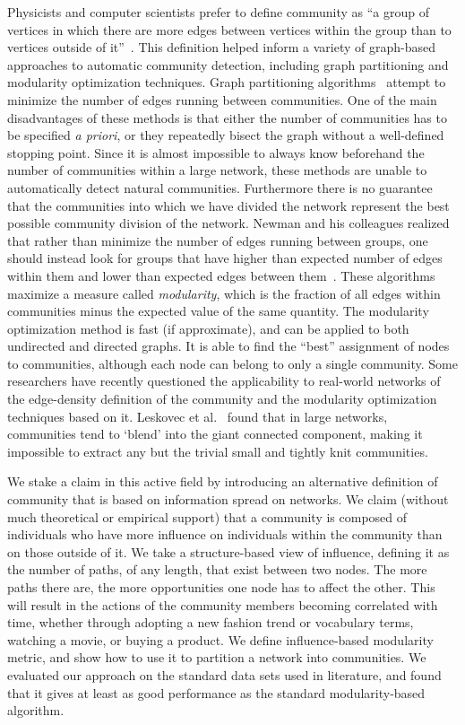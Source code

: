\documentclass{sig-alternate}
\begin{document}
Physicists and computer scientists prefer to define community as ``a group of vertices in which there are more edges between vertices within the group than to vertices outside of it''~\cite{Clauset}. This definition helped inform a variety of graph-based approaches to automatic community detection, including graph partitioning and modularity optimization techniques.  Graph partitioning algorithms~\cite{Fiedler,Pothen} attempt to minimize the number of edges running between communities.
One of the main disadvantages of these methods is that either the  number of communities has to be specified \emph{ a priori}, or they repeatedly bisect the graph without a well-defined stopping point. Since it is almost impossible to always know beforehand the number of communities within a large network, these methods are unable to automatically detect natural communities. Furthermore there is no guarantee that the communities into which we have divided the network represent the best possible community division of the network.
Newman and his colleagues realized that rather than minimize the number of edges running between groups, one should instead look for groups that have higher than expected number of edges within them and lower than expected edges between them~\cite{Newman104,Newman204,Newman106,Newman206}. These algorithms maximize a measure called \emph{modularity}, which is the fraction of all edges within communities minus the expected value of the same quantity.
The modularity optimization method is fast (if approximate), and can be applied to both undirected and directed graphs. It is able to find the ``best'' assignment of nodes to communities, although each node can belong  to only a single community.
Some researchers have recently questioned the applicability to real-world networks of the edge-density definition of the community and the modularity optimization techniques based on it. Leskovec et al.~\cite{Leskovec08www} found that in large networks, communities tend to `blend' into the giant connected component, making it impossible to extract any but the trivial small and tightly knit communities.


We stake a claim in this active field by introducing an alternative definition of community that is based on information spread on networks. We claim (without much theoretical or empirical support) that a community is composed of individuals who have more influence on individuals within the community than on those outside of it. We take a structure-based view of influence, defining it as the number of paths, of any length, that exist between two nodes. The more paths there are, the more opportunities one node has to affect the other. This will result in the actions of the community members becoming correlated with time, whether through adopting a new fashion trend or vocabulary terms, watching a movie, or buying a product. We define influence-based modularity metric, and show how to use it to partition a network into communities. We evaluated our approach on the standard data sets used in literature, and found that it gives at least as good performance as the standard modularity-based algorithm. 
\end{document}
